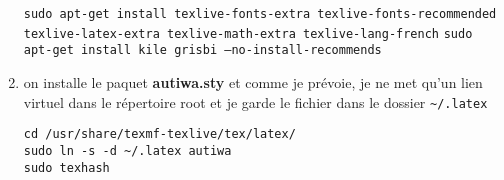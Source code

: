 \documentclass[a4paper,twoside]{article}
\begin{document}
\begin{enumerate}
\texttt{sudo apt-get install texlive-fonts-extra texlive-fonts-recommended texlive-latex-extra texlive-math-extra texlive-lang-french}
\texttt{sudo apt-get install kile grisbi --no-install-recommends}

%
\item on installe le paquet \textbf{autiwa.sty} et comme je prévoie, je ne met qu'un lien virtuel dans le répertoire root et je garde le fichier dans le dossier \verb|~/.latex|

\begin{verbatim}
cd /usr/share/texmf-texlive/tex/latex/
sudo ln -s -d ~/.latex autiwa
sudo texhash
\end{verbatim}


\end{enumerate}
\end{document}
